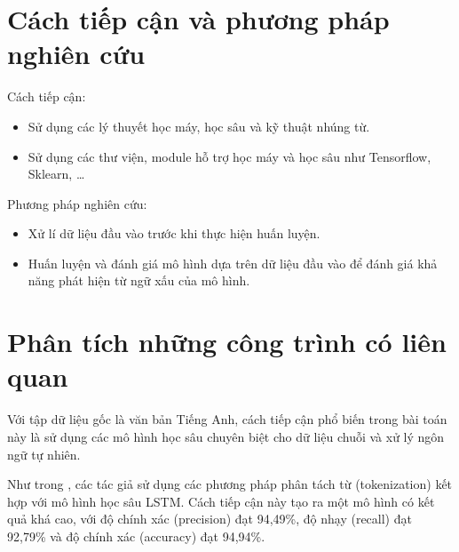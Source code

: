 \section{Cách tiếp cận và phương pháp nghiên cứu}
Cách tiếp cận:
\begin{itemize}
    \item Sử dụng các lý thuyết học máy, học sâu và kỹ thuật nhúng từ.
    \item Sử dụng các thư viện, module hỗ trợ học máy và học sâu như Tensorflow, Sklearn, \dots
\end{itemize}

Phương pháp nghiên cứu:
\begin{itemize}
    \item Xử lí dữ liệu đầu vào trước khi thực hiện huấn luyện.
    \item Huấn luyện và đánh giá mô hình dựa trên dữ liệu đầu vào để đánh giá khả năng phát hiện từ ngữ xấu của mô hình.
\end{itemize}

\section{Phân tích những công trình có liên quan}


Với tập dữ liệu gốc là văn bản Tiếng Anh, cách tiếp cận phổ biến trong bài toán này là sử dụng các mô hình học sâu chuyên biệt cho dữ liệu chuỗi và xử lý ngôn ngữ tự nhiên.

Như trong \cite{9339521}, các tác giả sử dụng các phương pháp phân tách từ (tokenization) kết hợp với mô hình học sâu LSTM. Cách tiếp cận này tạo ra một mô hình có kết quả khá cao, với độ chính xác (precision) đạt 94,49\%, độ nhạy (recall) đạt 92,79\% và độ chính xác (accuracy) đạt 94,94\%. 

